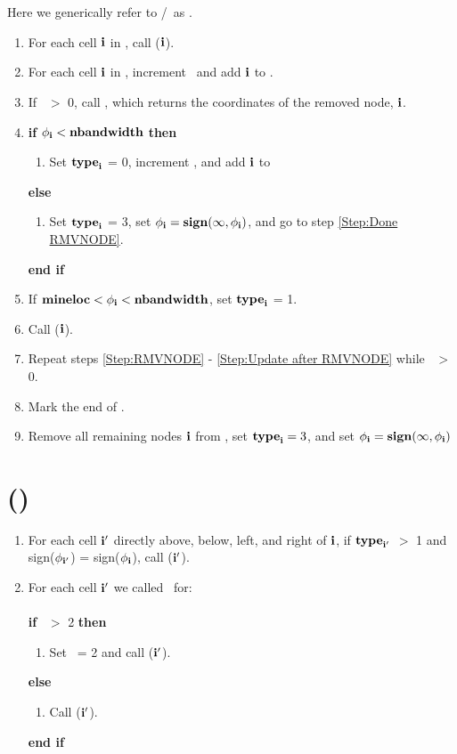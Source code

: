 \section{\FASTMARCH}
Here we generically refer to \intfacep/\intfacen~as \intface.
\begin{enumerate}
\item For each cell ${\bf i}$ in \intface, call \UPDATE(${\bf i}$).
\item For each cell ${\bf i}$ in \intface, increment \nbandnum~and add ${\bf i}$ to \nband.
\item \label{Step:RMVNODE} If \numtent~$>$ 0, call \RMVNODE, which returns the coordinates of the removed node, ${\bf i}$.
\item {\bf if} $\phi_{\bf i} < {\tt{\bf nbandwidth}}$ {\bf then}
\begin{enumerate}
\item Set ${\tt{\bf type}}_{\bf i}$ = 0, increment \nbandnum, and add ${\bf i}$ to \nband
\end{enumerate}
{\bf else}
\begin{enumerate}
\item Set ${\tt{\bf type}}_{\bf i}$ = 3, set $\phi_{\bf i} = {\tt{\bf sign}}(\infty,\phi_{\bf i})$, and go to step \ref{Step:Done RMVNODE}.
\end{enumerate}
{\bf end if}
\item If ${\tt{\bf mineloc}} < \phi_{\bf i} < {\tt{\bf nbandwidth}}$, set ${\tt{\bf type}}_{\bf i}$ = 1.
\item \label{Step:Update after RMVNODE} Call \UPDATE(${\bf i}$).
\item Repeat steps \ref{Step:RMVNODE} - \ref{Step:Update after RMVNODE} while \numtent~$>$ 0.
\item \label{Step:Done RMVNODE} Mark the end of \nband.
\item Remove all remaining nodes ${\bf i}$ from \heap, set ${\tt{\bf type}}_{\bf i} = 3$, and set $\phi_{\bf i} = {\tt{\bf sign}}(\infty,\phi_{\bf i})$
\end{enumerate}
\section{\UPDATE(\ib)}
\begin{enumerate}
\item For each cell ${\bf i}'$ directly above, below, left, and right of ${\bf i}$, if ${\tt{\bf type}}_{{\bf i}'}$ $>$ 1 and sign($\phi_{{\bf i}'}$) = sign($\phi_{\bf i}$), call \EVAL(${\bf i}'$).
\item For each cell ${\bf i}'$ we called \EVAL~for:\\ \\
{\bf if} \type~$>$ 2 {\bf then}
\begin{enumerate}
\item Set \type~= 2 and call \ADDNODE(${\bf i}'$).
\end{enumerate}
{\bf else}
\begin{enumerate}
\item Call \UPDATENODE(${\bf i}'$).
\end{enumerate}
{\bf end if}
\end{enumerate}
